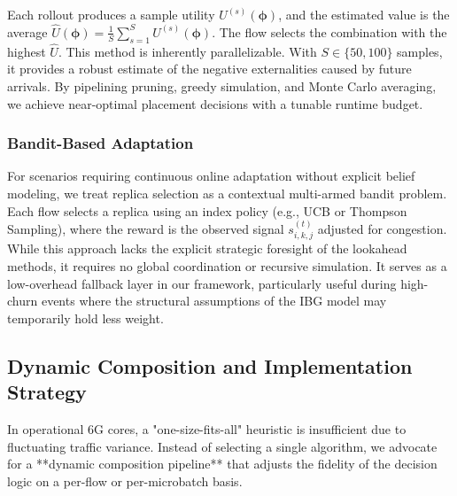 \documentclass[journal]{IEEEtran}
\theoremstyle{plain}
\theoremstyle{definition}
\theoremstyle{remark}
\begin{document}
Each rollout produces a sample utility $U^{(s)}(\boldsymbol{\phi})$, and the estimated value is the average $\hat{U}(\boldsymbol{\phi}) = \frac{1}{S} \sum_{s=1}^S U^{(s)}(\boldsymbol{\phi})$. The flow selects the combination with the highest $\hat{U}$. This method is inherently parallelizable. With $S \in \{50, 100\}$ samples, it provides a robust estimate of the negative externalities caused by future arrivals. By pipelining pruning, greedy simulation, and Monte Carlo averaging, we achieve near-optimal placement decisions with a tunable runtime budget.

\subsubsection{Bandit-Based Adaptation}
\label{sec:approx_bandit}

For scenarios requiring continuous online adaptation without explicit belief modeling, we treat replica selection as a contextual multi-armed bandit problem. Each flow selects a replica using an index policy (e.g., UCB or Thompson Sampling), where the reward is the observed signal $s_{i,k,j}^{(t)}$ adjusted for congestion. While this approach lacks the explicit strategic foresight of the lookahead methods, it requires no global coordination or recursive simulation. It serves as a low-overhead fallback layer in our framework, particularly useful during high-churn events where the structural assumptions of the IBG model may temporarily hold less weight.

\subsection{Dynamic Composition and Implementation Strategy}
\label{sec:approx_hybrid}

In operational 6G cores, a "one-size-fits-all" heuristic is insufficient due to fluctuating traffic variance. Instead of selecting a single algorithm, we advocate for a **dynamic composition pipeline** that adjusts the fidelity of the decision logic on a per-flow or per-microbatch basis.
\end{document}
